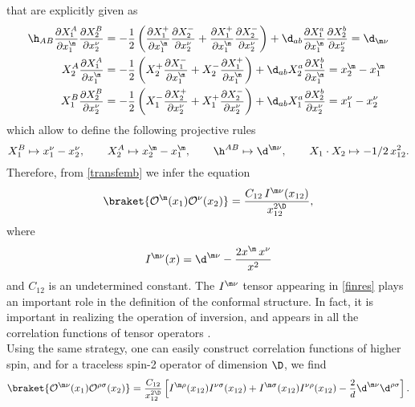 \documentclass[a4paper,11pt,openright,twoside]{book}
\newcommand{\mO}{\mathcal{O}}
\let\n=\nu      \let\x=\xi     \let\p=\pi      \let\r=\rho
\let\s=\sigma  \let\t=\tau     \let\u=\upsilon \let\f=\phi
\newcommand{\sdfrac}[2]{\mbox{\small$\displaystyle\frac{#1}{#2}$}}
\numberwithin{equation}{section}
\begin{document}
that are explicitly given as
\begin{align}
	\h_{AB}\sdfrac{\partial X_1^A}{\partial x_1^\m}\sdfrac{\partial X_2^B}{\partial x_2^\n}&=-\sdfrac{1}{2}\left(\sdfrac{\partial X_1^+}{\partial x_1^\m}\sdfrac{\partial X_2^-}{\partial x_2^\n}+\sdfrac{\partial X_1^+}{\partial x_1^\m}\sdfrac{\partial X_2^-}{\partial x_2^\n}\right)+\d_{ab}\sdfrac{\partial X_1^a}{\partial x_1^\m}\sdfrac{\partial X_2^b}{\partial x_2^\n}=\d_{\m\n}\\
	X_2^A\sdfrac{\partial X_1^A}{\partial x_1^\m}&=-\sdfrac{1}{2}\left(X_2^+\sdfrac{\partial X_1^-}{\partial x_1^\m}+X_2^-\sdfrac{\partial X_1^+}{\partial x_1^\m}\right)+\d_{ab}X_2^a\sdfrac{\partial X_1^b}{\partial x_1^\m}=x_2^\m-x_1^\m\\
	X_1^B\sdfrac{\partial X_2^B}{\partial x_2^\n}&=-\sdfrac{1}{2}\left(X_1^-\sdfrac{\partial X_2^+}{\partial x_2^\n}+X_1^+\sdfrac{\partial X_2^-}{\partial x_2^\n}\right)+\d_{ab}X_1^a\sdfrac{\partial X_2^b}{\partial x_2^\n}=x_1^\n-x_2^\n
\end{align}
which allow to define the following projective rules
\begin{equation}
	X_1^B\mapsto x_1^\n-x_2^\n,\qquad X_2^A\mapsto x_2^\m-x_1^\m,\qquad \h^{AB}\mapsto\d^{\m\n},\qquad X_1\cdot X_2\mapsto-1/2\,x_{12}^2.
\end{equation}
Therefore, from \eqref{transfemb} we infer the equation
\begin{equation}
	\braket{\mO^\m(x_1)\mO^\n(x_2)}=\frac{C_{12}\,I^{\m\n}(x_{12})}{x_{12}^{2\D}},\label{finres}
\end{equation}
where 
\begin{equation}
	I^{\m\n}(x)=\d^{\m\n}-\frac{2x^\m\,x^\n}{x^2}\label{Itensor}
\end{equation}
and $C_{12}$ is an undetermined constant. The $I^{\m\n}$ tensor appearing in \eqref{finres} plays an important role in the definition of the conformal structure. In fact, it is important in realizing the operation of inversion, and appears in all the correlation functions of tensor operators \cite{Osborn:1993cr, Erdmenger:1996yc}.\\
Using the same strategy, one can easily construct correlation functions of higher spin, and for a traceless spin-2 operator of dimension $\D$, we find
\begin{equation}
	\braket{\mO^{\m\n}(x_1)\mO^{\r\s}(x_2)}=\sdfrac{C_{12}}{x_{12}^{2\D}}\left[I^{\m\r}(x_{12})I^{\n\s}(x_{12})+I^{\m\s}(x_{12})I^{\n\r}(x_{12})-\sdfrac{2}{d}\d^{\m\n}\d^{\r\s}\right].\label{2poinembed}
\end{equation}
\end{document}
